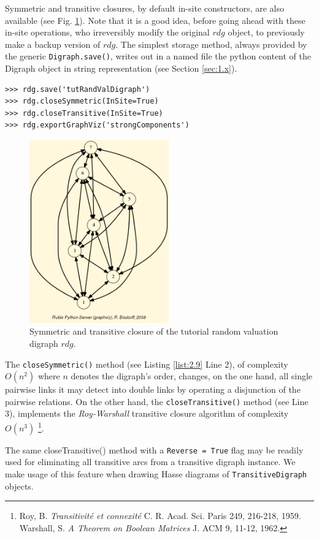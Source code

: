 Symmetric and transitive closures, by default in-site constructors, are also available (see Fig. \ref{fig:2.5}). Note that it is a good idea, before going ahead with these in-site operations, who irreversibly modify the original $rdg$ object, to previously make a backup version of $rdg$. The simplest storage method, always provided by the generic \texttt{Digraph.save()}, writes out in a named file the python content of the Digraph object in string representation (see Section \ref{sec:1.x}).
\begin{lstlisting}[caption={Symmeric and transitive closures},label=list:2.9]
>>> rdg.save('tutRandValDigraph')
>>> rdg.closeSymmetric(InSite=True)
>>> rdg.closeTransitive(InSite=True)
>>> rdg.exportGraphViz('strongComponents')
\end{lstlisting}
\begin{figure}[h]
\sidecaption
\includegraphics[width=6cm]{Figures/strongComponents.png}
\caption{Symmetric and transitive closure of the tutorial random valuation digraph $rdg$.}
\label{fig:2.5}       %
\end{figure}

The \texttt{closeSymmetric()} method (see Listing \ref{list:2.9}  Line 2), of complexity $O(n^2)$ where $n$ denotes the digraph's order, changes, on the one hand, all single pairwise links it may detect into double links by operating a disjunction of the pairwise relations. On the other hand, the \texttt{closeTransitive()} method (see Line 3), implements the \emph{Roy-Warshall} transitive closure algorithm of complexity $O(n^3)$ \footnote{Roy, B. \emph{Transitivité et connexité} C. R. Acad. Sci. Paris 249, 216-218, 1959. Warshall, S. \emph{A Theorem on Boolean Matrices} J. ACM 9, 11-12, 1962.}.

The same closeTransitive() method with a \texttt{Reverse = True} flag may be readily used for eliminating all transitive arcs from a transitive digraph instance. We make usage of this feature when drawing Hasse diagrams of \texttt{TransitiveDigraph} objects.

